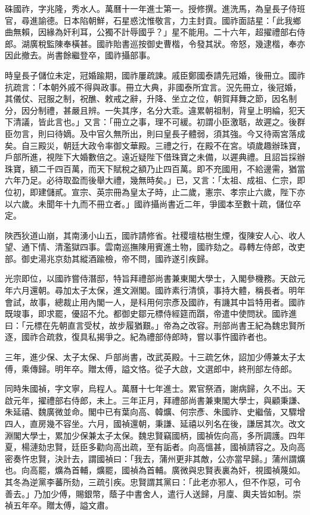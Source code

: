 \begin{pinyinscope}
硃國祚，字兆隆，秀水人。萬曆十一年進士第一。授修撰。進洗馬，為皇長子侍班官，尋進諭德。日本陷朝鮮，石星惑沈惟敬言，力主封貢。國祚面詰星：「此我鄉曲無賴，因緣為奸利耳，公獨不計辱國乎？」星不能用。二十六年，超擢禮部右侍郎。湖廣稅監陳奉橫甚。國祚貽書巡按御史曹楷，令發其狀。帝怒，幾逮楷，奉亦因此撤去。尚書餘繼登卒，國祚攝部事。

時皇長子儲位未定，冠婚踰期，國祚屢疏諫。戚臣鄭國泰請先冠婚，後冊立。國祚抗疏言：「本朝外戚不得與政事。冊立大典，非國泰所宜言。況先冊立，後冠婚，其儀仗、冠服之制，祝醮、敕戒之辭，升降、坐立之位，朝賀拜舞之節，因名制分，因分制禮，甚嚴且辨。一失其序，名分大乖。違累朝祖制，背皇上明綸，犯天下清議，皆此言也。」又言：「冊立之事，理不可緩。初謂小臣激聒，故遲之。後群臣勿言，則曰待嫡。及中官久無所出，則曰皇長子體弱，須其強。今又待兩宮落成矣。自三殿災，朝廷大政令率御文華殿。三禮之行，在殿不在宮。頃歲趣辦珠寶，戶部所進，視陛下大婚數倍之。遠近疑陛下借珠寶之未備，以遲典禮。且詔旨採辦珠寶，額二千四百萬，而天下賦稅之額乃止四百萬。即不充國用，不給邊需，猶當六年乃足。必待取盈而後舉大禮，幾無時矣。」已，又言：「太祖、成祖、仁宗，即位初，即建儲貳。宣宗、英宗冊為皇太子時，止二歲，憲宗、孝宗止六歲，陛下亦以六歲。未聞年十九而不冊立者。」國祚攝尚書近二年，爭國本至數十疏，儲位卒定。

陜西狄道山崩，其南湧小山五，國祚請修省。社稷壇枯樹生煙，復陳安人心、收人望、通下情、清濫獄四事。雲南巡撫陳用賓進土物，國祚劾之。尋轉左侍郎，改吏部。御史湯兆京劾其縱酒踰檢，帝不問，國祚遂引疾歸。

光宗即位，以國祚嘗侍潛邸，特旨拜禮部尚書兼東閣大學士，入閣參機務。天啟元年六月還朝。尋加太子太保，進文淵閣。國祚素行清慎，事持大體，稱長者。明年會試，故事，總裁止用內閣一人，是科用何宗彥及國祚，有譏其中旨特用者。國祚既竣事，即求罷，優詔不允。都御史鄒元標侍經筵而躓，帝遣中使問狀。國祚進曰：「元標在先朝直言受杖，故步履猶艱。」帝為之改容。刑部尚書王紀為魏忠賢所逐，國祚合疏救，復具私揭爭之。紀為禮部侍郎時，嘗以事忤國祚者也。

三年，進少保、太子太保、戶部尚書，改武英殿。十三疏乞休，詔加少傅兼太子太傅，乘傳歸。明年卒。贈太傅，謚文恪。從子大啟，文選郎中，終刑部左侍郎。

同時朱國禎，字文寧，烏程人。萬曆十七年進士。累官祭酒，謝病歸，久不出。天啟元年，擢禮部右侍郎，未上。三年正月，拜禮部尚書兼東閣大學士，與顧秉謙、朱延禧、魏廣微並命。閣中已有葉向高、韓爌、何宗彥、朱國祚、史繼偕，又驟增四人，直房幾不容坐。六月，國禎還朝，秉謙、延禧以列名在後，謙居其次。改文淵閣大學士，累加少保兼太子太保。魏忠賢竊國柄，國禎佐向高，多所調護。四年夏，楊漣劾忠賢，廷臣多勸向高出疏，至有詬者。向高慍甚，國禎請容之。及向高密奏忤忠賢，決計去，謂國禎曰：「我去，蒲州更非其敵，公亦當早歸。」蒲州謂爌也。向高罷，爌為首輔，爌罷，國禎為首輔。廣微與忠賢表裏為奸，視國禎蔑如。其冬為逆黨李蕃所劾，三疏引疾。忠賢謂其黨曰：「此老亦邪人，但不作惡，可令善去。」乃加少傅，賜銀幣，蔭子中書舍人，遣行人送歸，月廩、輿夫皆如制。崇禎五年卒。贈太傅，謚文肅。


\end{pinyinscope}
